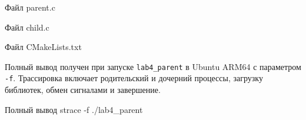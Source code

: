 \documentclass[12pt, a4paper]{article}
\begin{document}

\begin{listingblock}{Файл parent.c}
\end{listingblock}

\begin{listingblock}{Файл child.c}
\end{listingblock}

\begin{listingblock}{Файл CMakeLists.txt}
\end{listingblock}


Полный вывод получен при запуске \texttt{lab4\_parent} в Ubuntu ARM64 с параметром \texttt{-f}. Трассировка включает родительский и дочерний процессы, загрузку библиотек, обмен сигналами и завершение.

\begin{listingblock}{Полный вывод strace -f ./lab4\_parent}
\end{listingblock}
\end{document}
